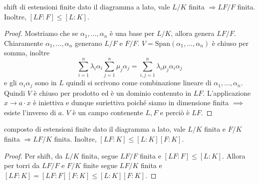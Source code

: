 \begin{minipage}{0.7\textwidth}
\begin{theorem}{shift di estensioni finite}
    dato il diagramma a lato, vale $L/K$ finita $\Rightarrow LF/F$ finita. Inoltre,  $[LF : F] \leq  [L:K]$.
\end{theorem}
\begin{proof}
    Mostriamo che se $\alpha_1,\dots, \alpha_n$ è una base per $L/K$, allora genera $LF/F$. Chiaramente $\alpha_1,\dots, \alpha_n$ generano $L/F$ e $F/F$. $V=\mathrm{Span}(\alpha_1,\dots,\alpha_n)$ è chiuso per somma, inoltre $$\sum_{i=1}^n\lambda_i\alpha_i\sum_{j=1}^n\mu_j\alpha_j=\sum_{i,j=1}^n\lambda_i\mu_j\alpha_i\alpha_j$$ e gli $\alpha_i\alpha_j$ sono in $L$ quindi si scrivono come combinazione lineare di $\alpha_1,\dots, \alpha_n$. Quindi $V$ è chiuso per prodotto ed è un dominio contenuto in $LF$. L'applicazione $x\to a\cdot x$ è iniettiva e dunque suriettiva poiché siamo in dimensione finita $\implies$ esiste l'inverso di $a$. $V$ è un campo contenente $L,F$ e perciò è $LF$.
\end{proof}
\end{minipage}\hfill
\begin{minipage}{0.3\textwidth}  
\end{minipage}\hfill
\begin{minipage}{0.7\textwidth}
\begin{theorem}{composto di estensioni finite}
    dato il diagramma a lato, vale $L/K$ finita  e $F/K$ finita $\Rightarrow LF/K$ finita. Inoltre, $[LF : K] \leq [L:K][F:K]$.
\end{theorem}
\begin{proof}
    Per shift, da $L/K$ finita, segue $LF/F$ finita e $[LF:F]\leq [L:K]$. Allora per torri da $LF/F$ e $F/K$ finite segue $LF/K$ finita e $[LF:K] = [LF:F][F:K] \leq [L:K][F:K]$.
\end{proof}
\end{minipage}\hfill
\begin{minipage}{0.3\textwidth}  
\end{minipage}\hfill

